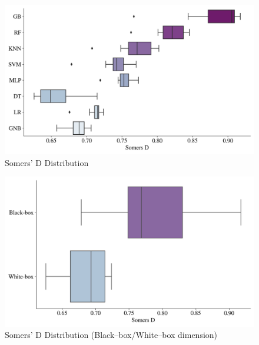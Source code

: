 \begin{figure}[H]
    \centering
    \caption{Somers' D Distribution}\vspace{0.5em}
    \label{fig:sddist}
    \includegraphics[width=140mm]{Figures/SOMERS D_Distribution.jpg}
    
    \vspace{-1em}
\end{figure}

\begin{figure}[H]
    \centering
    \caption{Somers' D Distribution (Black--box/White--box dimension)}\vspace{0.5em}
    \label{fig:sddistbbwb}
    \includegraphics[width=140mm]{Figures/SOMERS D_Distribution_BB_WB.jpg}
    
    \vspace{-1em}
\end{figure}
